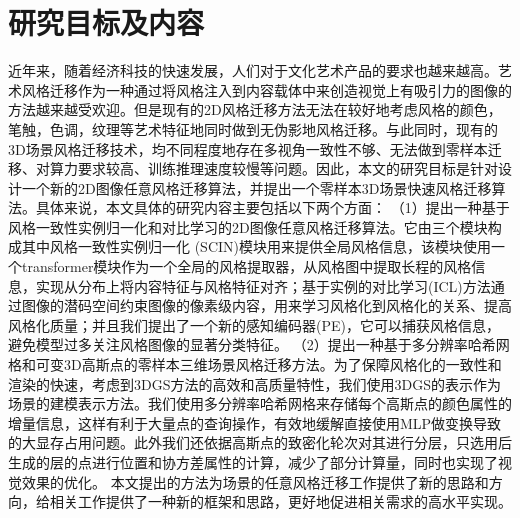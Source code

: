 

\section{研究目标及内容}
近年来，随着经济科技的快速发展，人们对于文化艺术产品的要求也越来越高。艺术风格迁移作为一种通过将风格注入到内容载体中来创造视觉上有吸引力的图像的方法越来越受欢迎。但是现有的2D风格迁移方法无法在较好地考虑风格的颜色，笔触，色调，纹理等艺术特征地同时做到无伪影地风格迁移。与此同时，现有的3D场景风格迁移技术，均不同程度地存在多视角一致性不够、无法做到零样本迁移、对算力要求较高、训练推理速度较慢等问题。因此，本文的研究目标是针对设计一个新的2D图像任意风格迁移算法，并提出一个零样本3D场景快速风格迁移算法。具体来说，本文具体的研究内容主要包括以下两个方面：
\newline \indent
（1）提出一种基于风格一致性实例归一化和对比学习的2D图像任意风格迁移算法。它由三个模块构成其中风格一致性实例归一化 (SCIN)模块用来提供全局风格信息，该模块使用一个transformer模块作为一个全局的风格提取器，从风格图中提取长程的风格信息，实现从分布上将内容特征与风格特征对齐；基于实例的对比学习(ICL)方法通过图像的潜码空间约束图像的像素级内容，用来学习风格化到风格化的关系、提高风格化质量；并且我们提出了一个新的感知编码器(PE)，它可以捕获风格信息，避免模型过多关注风格图像的显著分类特征。   
\newline \indent
（2）提出一种基于多分辨率哈希网格和可变3D高斯点的零样本三维场景风格迁移方法。为了保障风格化的一致性和渲染的快速，考虑到3DGS方法的高效和高质量特性，我们使用3DGS的表示作为场景的建模表示方法。我们使用多分辨率哈希网格来存储每个高斯点的颜色属性的增量信息，这样有利于大量点的查询操作，有效地缓解直接使用MLP做变换导致的大显存占用问题。此外我们还依据高斯点的致密化轮次对其进行分层，只选用后生成的层的点进行位置和协方差属性的计算，减少了部分计算量，同时也实现了视觉效果的优化。
\newline \indent	
本文提出的方法为场景的任意风格迁移工作提供了新的思路和方向，给相关工作提供了一种新的框架和思路，更好地促进相关需求的高水平实现。


